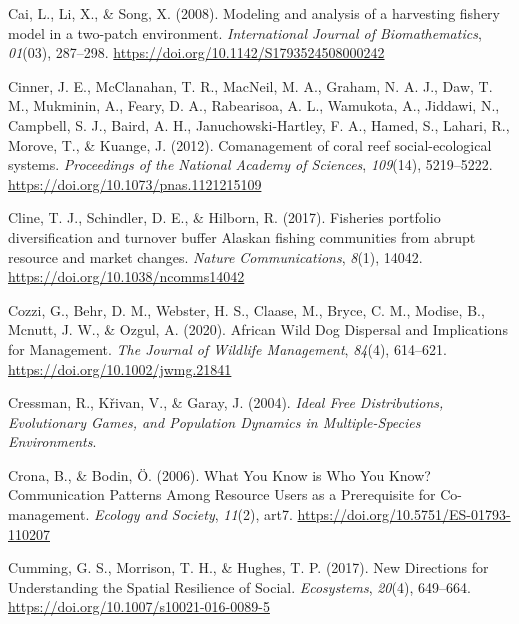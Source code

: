 \documentclass[
  12pt,
]{article}
\newlength{\cslhangindent}
\newlength{\cslentryspacingunit} %
\newenvironment{CSLReferences}[2] %
 {%
  \setlength{\parindent}{0pt}
  \ifodd #1
  \let\oldpar\par
  \def\par{\hangindent=\cslhangindent\oldpar}
  \fi
  \setlength{\parskip}{#2\cslentryspacingunit}
 }%
 {}
\begin{document}
\begin{CSLReferences}{1}{2}
\leavevmode{}%
Cai, L., Li, X., \& Song, X. (2008). Modeling and analysis of a harvesting fishery model in a two-patch environment. \emph{International Journal of Biomathematics}, \emph{01}(03), 287--298. \url{https://doi.org/10.1142/S1793524508000242}

\leavevmode{}%
Cinner, J. E., McClanahan, T. R., MacNeil, M. A., Graham, N. A. J., Daw, T. M., Mukminin, A., Feary, D. A., Rabearisoa, A. L., Wamukota, A., Jiddawi, N., Campbell, S. J., Baird, A. H., Januchowski-Hartley, F. A., Hamed, S., Lahari, R., Morove, T., \& Kuange, J. (2012). Comanagement of coral reef social-ecological systems. \emph{Proceedings of the National Academy of Sciences}, \emph{109}(14), 5219--5222. \url{https://doi.org/10.1073/pnas.1121215109}

\leavevmode{}%
Cline, T. J., Schindler, D. E., \& Hilborn, R. (2017). Fisheries portfolio diversification and turnover buffer {Alaskan} fishing communities from abrupt resource and market changes. \emph{Nature Communications}, \emph{8}(1), 14042. \url{https://doi.org/10.1038/ncomms14042}

\leavevmode{}%
Cozzi, G., Behr, D. M., Webster, H. S., Claase, M., Bryce, C. M., Modise, B., Mcnutt, J. W., \& Ozgul, A. (2020). African {Wild Dog Dispersal} and {Implications} for {Management}. \emph{The Journal of Wildlife Management}, \emph{84}(4), 614--621. \url{https://doi.org/10.1002/jwmg.21841}

\leavevmode{}%
Cressman, R., Křivan, V., \& Garay, J. (2004). \emph{Ideal {Free Distributions}, {Evolutionary Games}, and {Population Dynamics} in {Multiple-Species Environments}}.

\leavevmode{}%
Crona, B., \& Bodin, Ö. (2006). What {You Know} is {Who You Know}? {Communication Patterns Among Resource Users} as a {Prerequisite} for {Co-management}. \emph{Ecology and Society}, \emph{11}(2), art7. \url{https://doi.org/10.5751/ES-01793-110207}

\leavevmode{}%
Cumming, G. S., Morrison, T. H., \& Hughes, T. P. (2017). New {Directions} for {Understanding} the {Spatial Resilience} of {Social}. \emph{Ecosystems}, \emph{20}(4), 649--664. \url{https://doi.org/10.1007/s10021-016-0089-5}


\end{CSLReferences}
\end{document}
